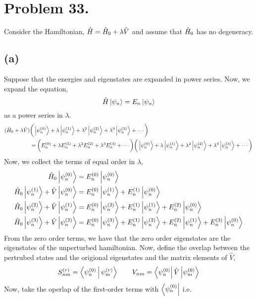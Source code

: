 \documentclass[12pt]{extarticle}
\begin{document}
\section*{Problem 33.}

Consider the Hamiltonian, $\hat{H} = \hat{H}_0 + \lambda \hat{V}$ and assume that $\hat{H}_0$ has no degeneracy. 
\subsection*{(a)}

Suppose that the energies and eigenstates are expanded in power series. Now, we expand the equation,
\[\hat{H} \left| \psi_n \right> = E_n \left| \psi_n \right>\]
as a power series in $\lambda$. 
\begin{align*}
(\hat{H}_0 + \lambda \hat{V}) & \bigg(\left| \psi^{(0)}_n \right> + \lambda \left| \psi^{(1)}_n \right> + \lambda^2 \left| \psi^{(2)}_n \right> + \lambda^3 \left| \psi^{(3)}_n \right> + \cdots \bigg) \\ & = \bigg(E^{(0)}_n + \lambda E^{(1)}_n + \lambda^2 E^{(2)}_n + \lambda^3 E^{(3)}_n + \cdots \bigg) \bigg(\left| \psi^{(0)}_n \right> + \lambda \left| \psi^{(1)}_n \right> + \lambda^2 \left| \psi^{(2)}_n \right> + \lambda^3 \left| \psi^{(3)}_n \right> + \cdots \bigg)
\end{align*}
Now, we collect the terms of equal order in $\lambda$,
\begin{align*}
\hat{H}_0 \left| \psi^{(0)}_n \right> &= E^{(0)}_n \left| \psi^{(0)}_n \right> \\
\hat{H}_0 \left| \psi^{(1)}_n \right> + \hat{V} \left| \psi^{(0)}_n \right> &= E^{(0)}_n \left| \psi^{(1)}_n \right> + E^{(1)}_n \left| \psi^{(0)}_n \right>  \\
\hat{H}_0 \left| \psi^{(2)}_n \right> + \hat{V} \left| \psi^{(1)}_n \right> &= E^{(0)}_n \left| \psi^{(2)}_n \right> + E^{(1)}_n \left| \psi^{(1)}_n \right> + E^{(2)}_n \left| \psi^{(0)}_n \right>  \\
\hat{H}_0 \left| \psi^{(3)}_n \right> + \hat{V} \left| \psi^{(2)}_n \right> &= E^{(0)}_n \left| \psi^{(3)}_n \right> + E^{(1)}_n \left| \psi^{(2)}_n \right> + E^{(2)}_n \left| \psi^{(1)}_n \right> + E^{(3)}_n \left| \psi^{(0)}_n \right>
\end{align*}
From the zero order terms, we have that the zero order eigenstates are the eigenstates of the unperturbed hamiltonian. Now, define the overlap between the pertrubed states and the origional eigenstates and the matrix elements of $\hat{V}$,
\begin{align*}
S^{(r)}_{nm} = \left< \psi^{(0)}_n \, \Big| \, \psi^{(r)}_{m} \right> \quad \quad V_{nm} = \left< \psi^{(0)}_n \right| \hat{V} \left| \psi^{(0)}_{m} \right>
\end{align*}
Now, take the operlap of the first-order terms with $\left< \psi^{(0)}_n \right|$ i.e.
\end{document}

